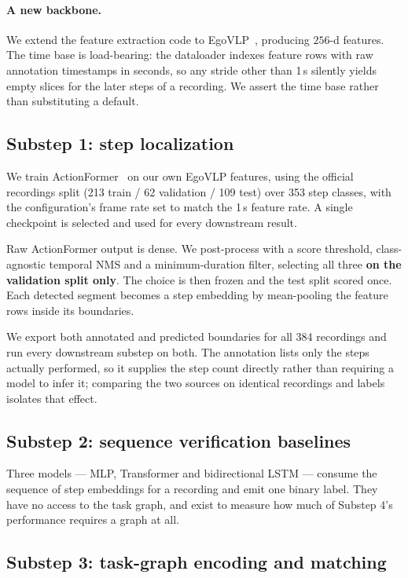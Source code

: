 \documentclass[10pt,twocolumn,letterpaper]{article}
\begin{document}
\paragraph{A new backbone.} We extend the feature extraction code to
EgoVLP~\cite{lin2022egovlp}, producing $256$-d features. The time base is
load-bearing: the dataloader indexes feature rows with raw annotation timestamps in
seconds, so any stride other than 1\,s silently yields empty slices for the later
steps of a recording. We assert the time base rather than substituting a default.

\subsection{Substep 1: step localization}

We train ActionFormer~\cite{zhang2022actionformer} on our own EgoVLP features,
using the official recordings split (213 train / 62 validation / 109 test) over
353 step classes, with the configuration's frame rate set to match the 1\,s
feature rate. A single checkpoint is selected and used for every downstream
result.

Raw ActionFormer output is dense. We post-process with a score threshold,
class-agnostic temporal NMS and a minimum-duration filter, selecting all three
\textbf{on the validation split only}. The choice is then frozen and the test
split scored once. Each detected segment becomes a step embedding by mean-pooling
the feature rows inside its boundaries.

We export both annotated and predicted boundaries for all 384 recordings and run
every downstream substep on both. The annotation lists only the steps actually
performed, so it supplies the step count directly rather than requiring a model to
infer it; comparing the two sources on identical recordings and labels isolates
that effect.

\subsection{Substep 2: sequence verification baselines}

Three models --- MLP, Transformer and bidirectional LSTM --- consume the sequence
of step embeddings for a recording and emit one binary label. They have no access
to the task graph, and exist to measure how much of Substep 4's performance
requires a graph at all.

\subsection{Substep 3: task-graph encoding and matching}
\end{document}
